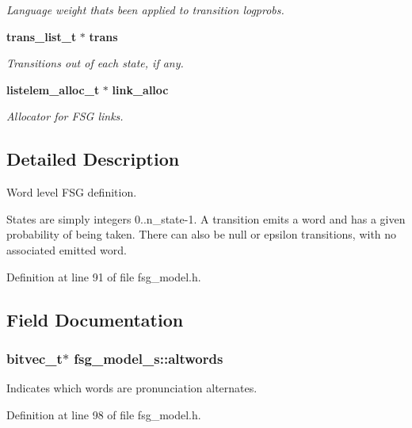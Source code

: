 \begin{DoxyCompactItemize}
\begin{DoxyCompactList}\small\item\em Language weight that\textquotesingle{}s been applied to transition logprobs. \end{DoxyCompactList}\item 
{\bf trans\+\_\+list\+\_\+t} $\ast$ {\bf trans}
\begin{DoxyCompactList}\small\item\em Transitions out of each state, if any. \end{DoxyCompactList}\item 
{\bf listelem\+\_\+alloc\+\_\+t} $\ast$ {\bf link\+\_\+alloc}
\begin{DoxyCompactList}\small\item\em Allocator for F\+S\+G links. \end{DoxyCompactList}\end{DoxyCompactItemize}


\subsection{Detailed Description}
Word level F\+S\+G definition. 

States are simply integers 0..n\+\_\+state-\/1. A transition emits a word and has a given probability of being taken. There can also be null or epsilon transitions, with no associated emitted word. 

Definition at line 91 of file fsg\+\_\+model.\+h.



\subsection{Field Documentation}
\subsubsection[{altwords}]{\setlength{\rightskip}{0pt plus 5cm}bitvec\+\_\+t$\ast$ fsg\+\_\+model\+\_\+s\+::altwords}\label{structfsg__model__s_adb51d840853d7ef3315bd833cddeb748}


Indicates which words are pronunciation alternates. 



Definition at line 98 of file fsg\+\_\+model.\+h.

